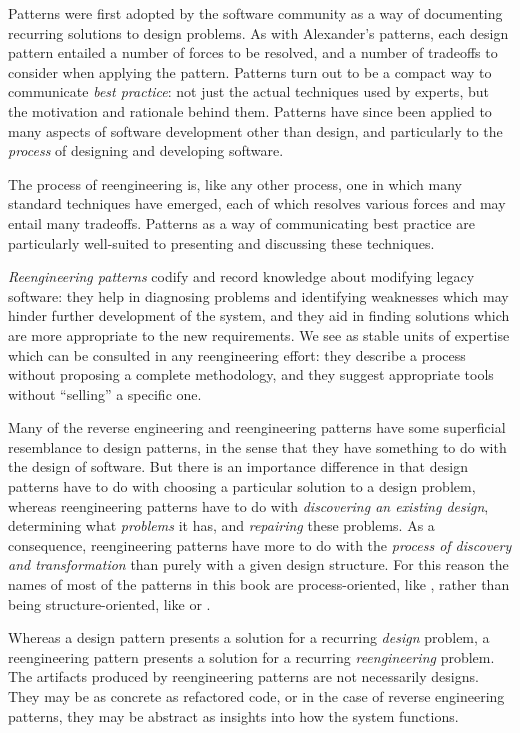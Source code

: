 \documentclass[a4paper,10pt,twoside]{book}
\begin{document}
Patterns were first adopted by the software community as a way of documenting recurring solutions to design problems. As with Alexander's patterns, each design pattern entailed a number of forces to be resolved, and a number of tradeoffs to consider when applying the pattern. Patterns turn out to be a compact way to communicate \emph{best practice}: not just the actual techniques used by experts, but the motivation and rationale behind them. Patterns have since been applied to many aspects of software development other than design, and particularly to the \emph{process} of designing and developing software.

The process of reengineering is, like any other process, one in which many standard techniques have emerged, each of which resolves various forces and may entail many tradeoffs. Patterns as a way of communicating best practice are particularly well-suited to presenting and discussing these techniques. 

\emph{Reengineering patterns} codify and record knowledge about modifying legacy software: they help in diagnosing problems and identifying weaknesses which may hinder further development of the system, and they aid in finding solutions which are more appropriate to the new requirements. We see  as stable units of expertise which can be consulted in any reengineering effort: they describe a process without proposing a complete methodology, and they suggest appropriate tools without ``selling'' a specific one. 

Many of the reverse engineering and reengineering patterns have some superficial resemblance to design patterns, in the sense that they have something to do with the design of software. But there is an importance difference in that design patterns have to do with choosing a particular solution to a design problem, whereas reengineering patterns have to do with \emph{discovering an existing design}, determining what \emph{problems} it has, and \emph{repairing} these problems. As a consequence, reengineering patterns have more to do with the \emph{process of discovery and transformation} than purely with a given design structure. For this reason the names of most of the patterns in this book are process-oriented, like , rather than being structure-oriented, like  or . 

Whereas a design pattern presents a solution for a recurring \emph{design} problem, a reengineering pattern presents a solution for a recurring \emph{reengineering} problem. The artifacts produced by reengineering patterns are not necessarily designs. They may be as concrete as refactored code, or in the case of reverse engineering patterns, they may be abstract as insights into how the system functions.
\end{document}
